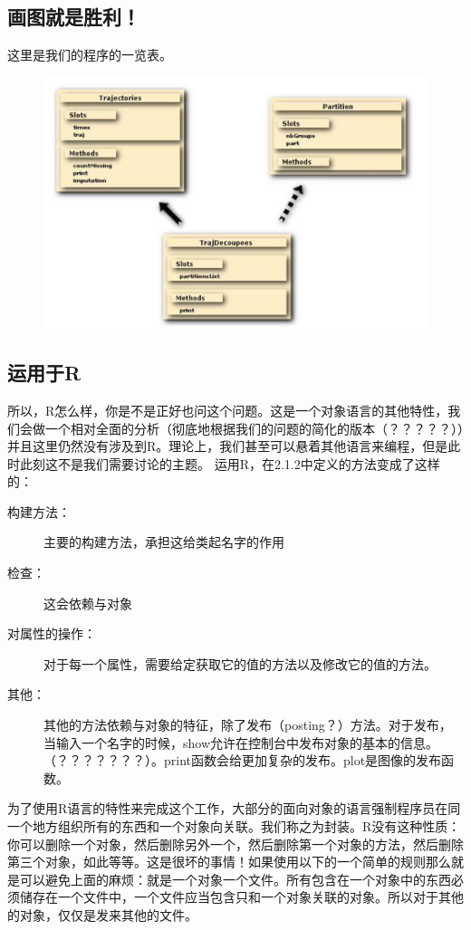 \documentclass[12pt,a4paper]{article}\usepackage{graphicx, color}
\begin{document}
\subsection{画图就是胜利！}
这里是我们的程序的一览表。
\begin{figure}[htbp]
\centering
\includegraphics[width=5in]{./screenshot02.png}
\caption{}
\label{}
\end{figure} 

\subsection{运用于R}
所以，R怎么样，你是不是正好也问这个问题。这是一个对象语言的其他特性，我们会做一个相对全面的分析（彻底地根据我们的问题的简化的版本（？？？？？））并且这里仍然没有涉及到R。理论上，我们甚至可以悬着其他语言来编程，但是此时此刻这不是我们需要讨论的主题。
运用R，在2.1.2中定义的方法变成了这样的：
\begin{description}
  \item[构建方法：]主要的构建方法，承担这给类起名字的作用
  \item[检查：]这会依赖与对象
  \item[对属性的操作：]对于每一个属性，需要给定获取它的值的方法以及修改它的值的方法。
  \item[其他：]其他的方法依赖与对象的特征，除了发布（posting？）方法。对于发布，当输入一个名字的时候，show允许在控制台中发布对象的基本的信息。（？？？？？？？）。print函数会给更加复杂的发布。plot是图像的发布函数。
\end{description}

\scalebox{4}{\HandRight}为了使用R语言的特性来完成这个工作，大部分的面向对象的语言强制程序员在同一个地方组织所有的东西和一个对象向关联。我们称之为封装。R没有这种性质：你可以删除一个对象，然后删除另外一个，然后删除第一个对象的方法，然后删除第三个对象，如此等等。这是很坏的事情！如果使用以下的一个简单的规则那么就是可以避免上面的麻烦：就是一个对象一个文件。所有包含在一个对象中的东西必须储存在一个文件中，一个文件应当包含只和一个对象关联的对象。所以对于其他的对象，仅仅是发来其他的文件。
\end{document}
